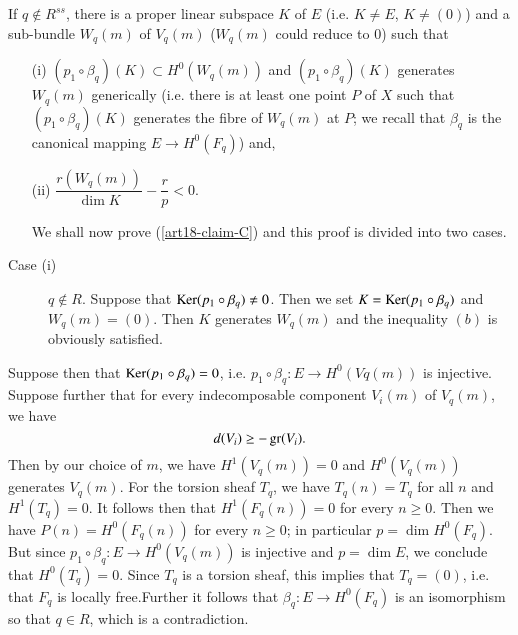 \begin{alphaclaim}\label{art18-claim-C}
If $q\not\in R^{ss}$, there is a proper linear subspace $K$ of $E$ (i.e. $K\neq E$, $K\neq (0)$) and a sub-bundle $W_{q}(m)$ of $V_{q}(m)$ ($W_{q}(m)$ could reduce to $0$) such that
\begin{itemize}
\item[(i)] $(p_{1}\circ \beta_{q})(K)\subset H^{0}(W_{q}(m))$ and $(p_{1}\circ \beta_{q})(K)$ generates $W_{q}(m)$ generically (i.e. there is at least one point $P$ of $X$ such that $(p_{1}\circ \beta_{q})(K)$ generates the fibre of $W_{q}(m)$ at $P$; we recall that $\beta_{q}$ is the canonical mapping $E\to H^{0}(F_{q})$) and,

\item[(ii)]\hfill $\dfrac{r(W_{q}(m))}{\dim K}-\dfrac{r}{p}<0$.\hfill\,

\smallskip
We shall now prove (\ref{art18-claim-C}) and this proof is divided into two cases.
\end{itemize}
\end{alphaclaim}

\begin{description}
\item[Case (i)] $q\not\in R$. Suppose that $\operatorname{\mathrm{Ker}} (p_{1}\circ \beta_{q})\neq 0$. Then we set $K=\operatorname{\mathrm{Ker}} (p_{1}\circ \beta_{q})$ and $W_{q}(m)=(0)$. Then $K$ generates $W_{q}(m)$ and the inequality $(b)$ is obviously satisfied.
\end{description}

Suppose then that $\operatorname{\mathrm{Ker}} (p_{1}\circ \beta_{q})=0$, i.e. $p_{1}\circ \beta_{q}:E\to H^{0}(Vq(m))$ is injective. Suppose further that for every indecomposable component $V_{i}(m)$ of $V_{q}(m)$, we have
$$
d(V_{i})\geq -\operatorname{\mathrm{gr}} (V_{i}).
$$
Then by our choice of $m$, we have $H^{1}(V_{q}(m))=0$ and $H^{0}(V_{q}(m))$ generates $V_{q}(m)$. For the torsion sheaf $T_{q}$, we have $T_{q}(n)=T_{q}$ for all $n$ and $H^{1}(T_{q})=0$. It follows then that $H^{1}(F_{q}(n))=0$ for every $n\geq 0$. Then we have $P(n)=H^{0}(F_{q}(n))$ for every $n\geq 0$; in particular $p=\dim H^{0}(F_{q})$. But since $p_{1}\circ \beta_{q}:E\to H^{0}(V_{q}(m))$ is injective and $p=\dim E$, we conclude that $H^{0}(T_{q})=0$. Since $T_{q}$ is a torsion sheaf, this implies that $T_{q}=(0)$, i.e. that $F_{q}$ is locally free.\pageoriginale Further it follows that $\beta_{q}:E\to H^{0}(F_{q})$ is an isomorphism so that $q\in R$, which is a contradiction.

